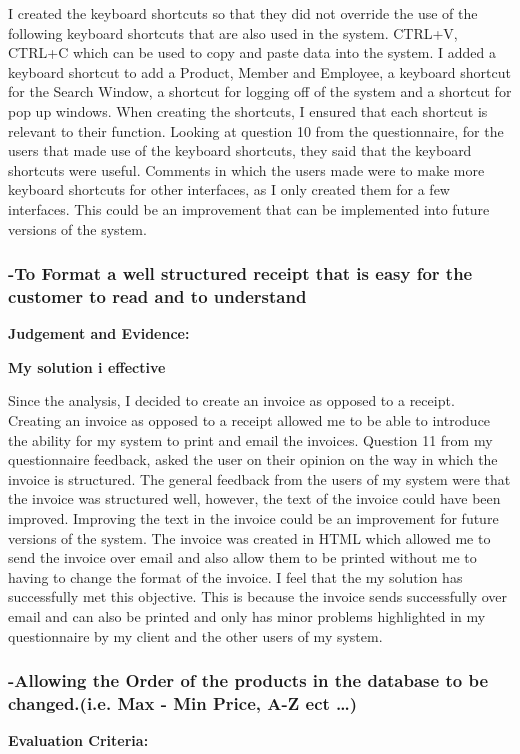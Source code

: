 I created the keyboard shortcuts so that they did not override the use of the following keyboard shortcuts that are also used in the system. CTRL+V, CTRL+C which can be used to copy and paste data into the system. I added a keyboard shortcut to add a Product, Member and Employee, a keyboard shortcut for the Search Window, a shortcut for logging off of the system and a shortcut for pop up windows. When creating the shortcuts, I ensured that each shortcut is relevant to their function. Looking at question 10 from the questionnaire, for the users that made use of the keyboard shortcuts,  they said that the keyboard shortcuts were useful. Comments in which the users made were to make more keyboard shortcuts for other interfaces, as I only created them for a few interfaces. This could be an improvement that can be implemented into future versions of the system.




\pagebreak
\subsubsection{-To Format a well structured receipt that is easy for the customer to read and to understand}

\textbf{Judgement and Evidence:} \newline

\textbf{\large{My solution i effective}}

Since the analysis, I decided to create an invoice as opposed to a receipt. Creating an invoice as opposed to a receipt allowed me to be able to introduce the ability for my system to print and email the invoices. Question 11 from my questionnaire feedback, asked the user on their opinion on the way in which the invoice is structured. The general feedback from the users of my system were that the invoice was structured well, however, the text of the invoice could have been improved. Improving the text in the invoice could be an improvement for future versions of the system. The invoice was created in HTML which allowed me to send the invoice over email and also allow them to be printed without me to having to change the format of the invoice. I feel that the my solution has successfully met this objective. This is because the invoice sends successfully over email and can also be printed and only has minor problems highlighted in my questionnaire by my client and the other users of my system.




\pagebreak
\subsubsection{-Allowing the Order of the products in the database to be changed.(i.e. Max - Min Price, A-Z ect \ldots)}\textbf{Evaluation Criteria:} \newline

